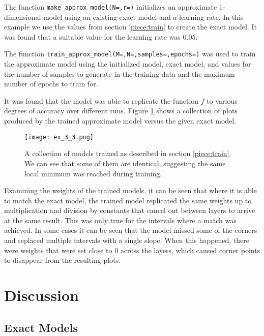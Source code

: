 \documentclass{somasmsc}
\begin{document}
\begin{exa}
The function \verb|make_approx_model(N=,r=)| initializes an approximate 1-dimensional model using an existing exact model and a learning rate. In this example we use the values from section \ref{piece:train} to create the exact model. It was found that a suitable value for the learning rate was 0.05.

The function \verb|train_approx_model(M=,N=,samples=,epochs=)| was used to train the approximate model using the initialized model, exact model, and values for the number of samples to generate in the training data and the maximum number of epochs to train for.

It was found that the model was able to replicate the function $f$ to various degrees of accuracy over different runs. Figure \ref{piece:ex_3_3} shows a collection of plots produced by the trained approximate model versus the given exact model.

\begin{figure}[H]\label{piece:ex_3_3}
\begin{center}
\texttt{[image: ex\_3\_3.png]}
\end{center}
\caption{A collection of models trained as described in section \ref{piece:train}. We can see that some of them are identical, suggesting the same local minimum was reached during training.}
\end{figure}

Examining the weights of the trained models, it can be seen that where it is able to match the exact model, the trained model replicated the same weights up to multiplication and division by constants that cancel out between layers to arrive at the same result. This was only true for the intervals where a match was achieved. In some cases it can be seen that the model missed some of the corners and replaced multiple intervals with a single slope. When this happened, there were weights that were set close to 0 across the layers, which caused corner points to disappear from the resulting plots.
\end{exa}

\section{Discussion}

\subsection{Exact Models}
\end{document}
